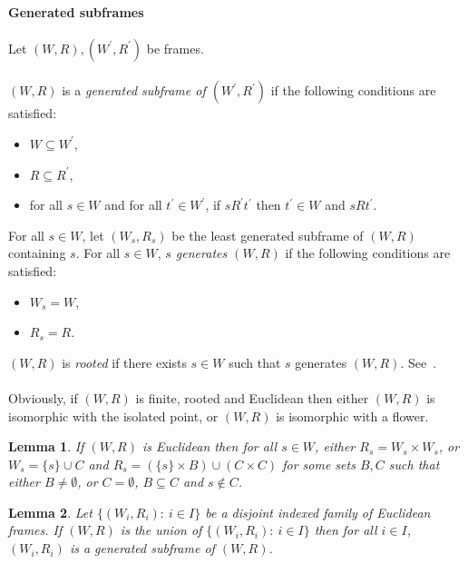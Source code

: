 \documentclass[draft]{article}
\newtheorem{lemma}{Lemma}
\begin{document}
\paragraph{Generated subframes}
%
%
Let $(W,R),(W^{\prime},R^{\prime})$ be frames.
%
%
\\
\\
%
%
$(W,R)$ is a {\it generated subframe of $(W^{\prime},R^{\prime})$}\/ if the following conditions are satisfied:
%
%
\begin{itemize}
%
%
\item $W{\subseteq}W^{\prime}$,
%
%
\item $R{\subseteq}R^{\prime}$,
%
%
\item for all $s{\in}W$ and for all $t^{\prime}{\in}W^{\prime}$, if $s{R^{\prime}}t^{\prime}$ then $t^{\prime}{\in}W$ and $s{R}t^{\prime}$.
%
%
\end{itemize}
%
%
For all $s{\in}W$, let $(W_{s},R_{s})$ be the least generated subframe of $(W,R)$ containing $s$.
For all $s{\in}W$, {\it $s$ generates $(W,R)$}\/ if the following conditions are satisfied:
%
%
\begin{itemize}
%
%
\item $W_{s}{=}W$,
%
%
\item $R_{s}{=}R$.
%
%
\end{itemize}
%
%
$(W,R)$ is {\it rooted}\/ if there exists $s{\in}W$ such that $s$ generates $(W,R)$.
See~\cite[Chapter~$3$]{Blackburn:deRijke:Venema:2001}.
%
%
\\
\\
%
%
Obviously, if $(W,R)$ is finite, rooted and Euclidean then either $(W,R)$ is isomorphic with the isolated point, or $(W,R)$ is isomorphic with a flower.
%
%
\begin{lemma}\label{lemma:generated:subframe:from:a:single:point:has:specific:shapes}
%
%
If $(W,R)$ is Euclidean then for all $s{\in}W$, either $R_{s}{=}W_{s}{\times}W_{s}$, or $W_{s}{=}\{s\}{\cup}C$ and $R_{s}{=}(\{s\}{\times}B){\cup}(C{\times}C)$ for some sets $B,C$ such that either $B{\not=}\emptyset$, or $C{=}\emptyset$, $B{\subseteq}C$ and $s{\not\in}C$.
%
%
\end{lemma}
%
%
\begin{lemma}\label{lemma:about:generated:subframe:and:disjoint:unions}
%
%
Let $\{(W_{i},R_{i}):\ i{\in}I\}$ be a disjoint indexed family of Euclidean frames.
If $(W,R)$ is the union of $\{(W_{i},R_{i}):\ i{\in}I\}$ then for all $i{\in}I$, $(W_{i},R_{i})$ is a generated subframe of $(W,R)$.
%
%
\end{lemma}
%
%
\end{document}
